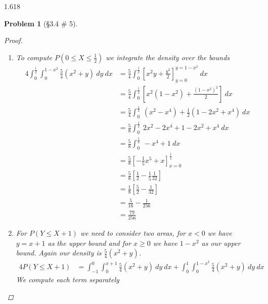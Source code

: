 \documentclass[11pt, oneside]{book}   	%
\newtheorem{problem}{Problem}[section]
\begin{document}
\begin{spacing}{1.618}
\begin{problem}[\S 3.4 \# 5]
\begin{proof}
\begin{enumerate}
\begin{alignat}{4}
									&=\frac{c}{2}\int_{-1}^1 2x^2-2x^4+1-2x^2+x^4 ~ dx \\
									&=\frac{c}{2} \int_{-1}^1 -x^4+1 ~ dx \\
									&=\frac{c}{2} \left[ -\frac{1}{5}x^5 + x\right]_{x=-1}^1 \\
									&=\frac{c}{2} \left[ 1-\frac{1}{5} +1 - \frac{1}{5}  \right] \\
									&=\frac{c}{2} \frac{8}{5} \\
									&={c}\frac{4}{5}
							\end{alignat}
							and so $c=\frac{5}{4}$. 
						\item To compute $P\left(0\leq X \leq \frac{1}{2}\right)$ we integrate the density over the bounds
							\begin{alignat}{4}
								\int_{0}^\frac{1}{2}\int_{0}^{1-x^2} \frac{5}{4}\left(x^2+y\right)~dy~dx &=\frac{5}{4} \int_{0}^\frac{1}{2} \left[ x^2y + \frac{y^2}{2}\right]_{y=0}^{y=1-x^2} ~ dx \\
									&= \frac{5}{4}\int_{0}^\frac{1}{2}\left[ x^2(1-x^2)+\frac{\left(1-x^2\right)^2}{2} \right] ~ dx \\
									&=\frac{5}{4}\int_{0}^\frac{1}{2}\ \left(x^2 - x^4\right) + \frac{1}{2}\left(1-2x^2+x^4\right)~dx \\
									&=\frac{5}{8}\int_{0}^\frac{1}{2}\ 2x^2-2x^4+1-2x^2+x^4 ~ dx \\
									&=\frac{5}{8} \int_{0}^\frac{1}{2}\ -x^4+1 ~ dx \\
									&=\frac{5}{8} \left[ -\frac{1}{5}x^5 + x\right]_{x=0}^{\frac{1}{2}} \\
									&=\frac{5}{8} \left[\frac{1}{2} - \frac{1}{5}\frac{1}{32} \right]\\
									&=\frac{1}{8}\left[\frac{5}{2}-\frac{1}{32}\right] \\
									&=\frac{5}{16}-\frac{1}{256} \\
									&=\frac{79}{256}
							\end{alignat}
						\item For $P(Y\leq X+1)$ we need to consider two areas, for $x<0$ we have $y=x+1$ as the upper bound and for $x\geq0$ we have $1-x^2$ as our upper bound. Again our density is $\frac{5}{4}\left(x^2+y\right)$. 
						\begin{alignat}{4}
							P(Y\leq X+1)&=\int_{-1}^0\int_{0}^{x+1}\frac{5}{4}\left(x^2+y\right)~dy~dx + \int_{0}^1\int_{0}^{1-x^2}\frac{5}{4}\left(x^2+y\right)~dy~dx
						\end{alignat}
						We compute each term separately 

\end{enumerate}
\end{proof}
\end{problem}
\end{spacing}
\end{document}
